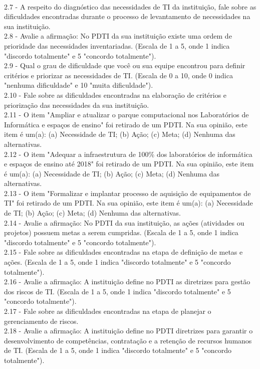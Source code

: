 \\2.7 - A respeito do diagnóstico das necessidades de TI da instituição, fale sobre as dificuldades encontradas durante o processo de levantamento de necessidades na sua instituição.
\\2.8 - Avalie a afirmação: No PDTI da sua instituição existe uma ordem de prioridade das necessidades inventariadas. (Escala de 1 a 5, onde 1 indica "discordo totalmente" e 5 "concordo totalmente").
\\2.9 - Qual o grau de dificuldade que você ou sua equipe encontrou para definir critérios e priorizar as necessidades de TI. (Escala de 0 a 10, onde 0 indica "nenhuma dificuldade" e 10 "muita dificuldade").
\\2.10 - Fale sobre as dificuldades encontradas na elaboração de critérios e priorização das necessidades da sua instituição.
\\2.11 - O item "Ampliar e atualizar o parque computacional nos Laboratórios de Informática e espaços de ensino" foi retirado de um PDTI. Na sua opinião, este item é um(a): 
(a) Necessidade de TI; (b) Ação; (c) Meta; (d) Nenhuma das alternativas.
\\2.12 - O item "Adequar a infraestrutura de 100\% dos laboratórios de informática e espaços de ensino até 2018" foi retirado de um PDTI. Na sua opinião, este item é um(a):
(a) Necessidade de TI; (b) Ação; (c) Meta; (d) Nenhuma das alternativas.
\\2.13 - O item "Formalizar e implantar processo de aquisição de equipamentos de TI" foi retirado de um PDTI. Na sua opinião, este item é um(a):
(a) Necessidade de TI; (b) Ação; (c) Meta; (d) Nenhuma das alternativas.
\\2.14 - Avalie a afirmação: No PDTI da sua instituição, as ações (atividades ou projetos) possuem metas a serem cumpridas. (Escala de 1 a 5, onde 1 indica "discordo totalmente" e 5 "concordo totalmente").
\\2.15 - Fale sobre as dificuldades encontradas na etapa de definição de metas e ações. (Escala de 1 a 5, onde 1 indica "discordo totalmente" e 5 "concordo totalmente").
\\2.16 - Avalie a afirmação: A instituição define no PDTI as diretrizes para gestão dos riscos de TI. (Escala de 1 a 5, onde 1 indica "discordo totalmente" e 5 "concordo totalmente").
\\2.17 - Fale sobre as dificuldades encontradas na etapa de planejar o gerenciamento de riscos.
\\2.18 - Avalie a afirmação: A instituição define no PDTI diretrizes para garantir o desenvolvimento de competências, contratação e a retenção de recursos humanos de TI. (Escala de 1 a 5, onde 1 indica "discordo totalmente" e 5 "concordo totalmente").

